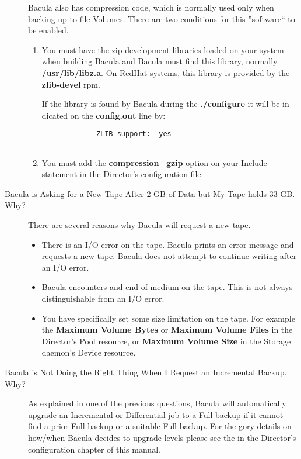 \begin{description}
   Bacula also has compression code, which is normally used only when  backing up
   to file Volumes. There are two conditions for this  ''software`` to be
   enabled.  

\begin{enumerate}
\item You must have the zip development libraries loaded on your  system when
   building Bacula and Bacula must find this library,  normally {\bf
   /usr/lib/libz.a}. On RedHat systems, this library  is provided by the {\bf
   zlib-devel} rpm.  

 If the library is found by Bacula during the {\bf ./configure}  it will be
 in dicated on the {\bf config.out} line by:  

\footnotesize
\begin{verbatim}
             ZLIB support:  yes
          
\end{verbatim}
\normalsize

\item You must add the {\bf compression=gzip} option on your  Include
   statement in the Director's configuration file.  
\end{enumerate}

\label{NewTape}
\item [Bacula is Asking for a New Tape After 2 GB of Data but My Tape
   holds 33 GB. Why?]
There are several reasons why Bacula will request a new tape.  

\begin{itemize}
\item There is an I/O error on the tape. Bacula prints an error message  and
   requests a new tape. Bacula does not attempt to continue writing  after an I/O
   error.  
\item Bacula encounters and end of medium on the tape. This is not always 
   distinguishable from an I/O error.  
\item You have specifically set some size limitation on the tape. For  example
   the {\bf Maximum Volume Bytes} or {\bf Maximum Volume Files}  in the
   Director's Pool resource, or {\bf Maximum Volume Size} in  the Storage
  daemon's Device resource.  
\end{itemize}

\label{LevelChanging}

\item [Bacula is Not Doing the Right Thing When I Request an Incremental
   Backup. Why?]
   As explained in one of the previous questions, Bacula will automatically 
   upgrade an Incremental or Differential job to a Full backup if it cannot  find
   a prior Full backup or a suitable Full backup. For the gory details  on
   how/when Bacula decides to upgrade levels please see the  
    in the Director's  configuration
   chapter of this manual.  
   

\end{description}
